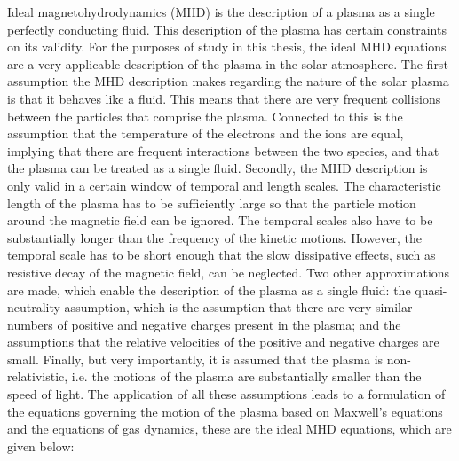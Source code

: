 \documentclass[a4paper,12pt,fourier,authoryear,custommargin]{Classes/PhDThesisPSnPDF}
\renewcommand{\vec}{\mathbf}
\begin{document}
Ideal magnetohydrodynamics (MHD) is the description of a plasma as a single perfectly conducting fluid.
This description of the plasma has certain constraints on its validity.
For the purposes of study in this thesis, the ideal MHD equations are a very applicable description of the plasma in the solar atmosphere.
The first assumption the MHD description makes regarding the nature of the solar plasma is that it behaves like a fluid.
This means that there are very frequent collisions between the particles that comprise the plasma.
Connected to this is the assumption that the temperature of the electrons and the ions are equal, implying that there are frequent interactions between the two species, and that the plasma can be treated as a single fluid.
Secondly, the MHD description is only valid in a certain window of temporal and length scales.
The characteristic length of the plasma has to be sufficiently large so that the particle motion around the magnetic field can be ignored.
The temporal scales also have to be substantially longer than the frequency of the kinetic motions.
However, the temporal scale has to be short enough that the slow dissipative effects, such as resistive decay of the magnetic field, can be neglected.
Two other approximations are made, which enable the description of the plasma as a single fluid: the quasi-neutrality assumption, which is the assumption that there are very similar numbers of positive and negative charges present in the plasma; and the assumptions that the relative velocities of the positive and negative charges are small.
Finally, but very importantly, it is assumed that the plasma is non-relativistic, i.e. the motions of the plasma are substantially smaller than the speed of light.
The application of all these assumptions leads to a formulation of the equations governing the motion of the plasma based on Maxwell's equations and the equations of gas dynamics, these are the ideal MHD equations, which are given below:
\newcommand{\condev}{\left(\frac{\partial}{\partial t} + \vec{v}\cdot\nabla\right)}
\end{document}
